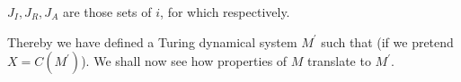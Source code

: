 $J_I, J_R, J_A$ are those sets of $i$, for which \IM{\sigma = \INI, \ACC, \REJ} respectively.

Thereby we have defined a Turing dynamical system $M^\prime$ such that  (if we pretend $X = C(M^\prime)$).
We shall now see how properties of $M$ translate to $M^\prime$.

